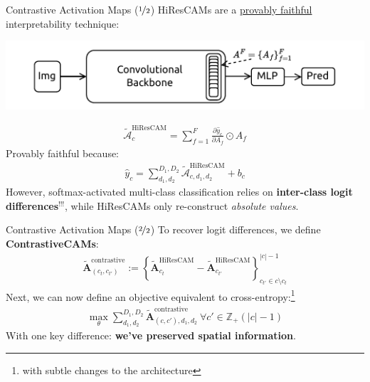 \documentclass{beamer}
\begin{document}
\begin{frame}{Contrastive Activation Maps ($\nicefrac{1}{2}$)}
	HiResCAMs are a \underline{provably faithful} interpretability technique:
	\begin{center}
		\vspace{-1em}
		\includegraphics[width=\textwidth]{img/cams.pdf}
	\end{center}
	\vspace{-2em}
	\begin{gather}
		\tilde{\mathcal{A}}^{\text{HiResCAM}}_{c} = \sum^{F}_{f=1} \frac{\partial \hat{y}_c}{\partial A_f} \odot A_f
	\end{gather} \pause
	Provably faithful because:
	\vspace{-1em}
	\begin{gather}
		\hat{y}_c = \sum^{D_1, D_2}_{d_1, d_2} \tilde{\mathcal{A}}^{\text{HiResCAM}}_{c, d_1, d_2} + b_c
	\end{gather} \pause
	However, softmax-activated multi-class classification relies on \textbf{inter-class logit differences${}^{\bm{!!!}}$}, while HiResCAMs only re-construct \textit{absolute values}.
\end{frame}

\begin{frame}{Contrastive Activation Maps ($\nicefrac{2}{2}$)}
	To recover logit differences, we define \textbf{ContrastiveCAMs}:
	\begin{gather}
			\tilde{\mathcal{\bm{A}}}^{\text{contrastive}}_{(c_t, c_{t'})} := \left\{\tilde{\mathcal{\bm{A}}}_{c_t}^{\text{HiResCAM}} - \tilde{\mathcal{\bm{A}}}_{c_{t'}}^{\text{HiResCAM}}\right\}^{|c|-1}_{c_{t'} \in c \setminus c_t}
	\end{gather} \pause
	Next, we can now define an objective equivalent to cross-entropy:\footnote{with subtle changes to the architecture}
	\begin{gather}
		\max_{\theta} \sum^{D_1,D_2}_{d_1,d_2}\tilde{\mathcal{\bm{A}}}_{(c, c'),d_1,d_2}^{\text{contrastive}}\ \forall c' \in \mathbb{Z}_{+}(|c| - 1)
	\end{gather}
	\pause
	With one key difference: \textbf{we've preserved spatial information}.
\end{frame}
\end{document}
